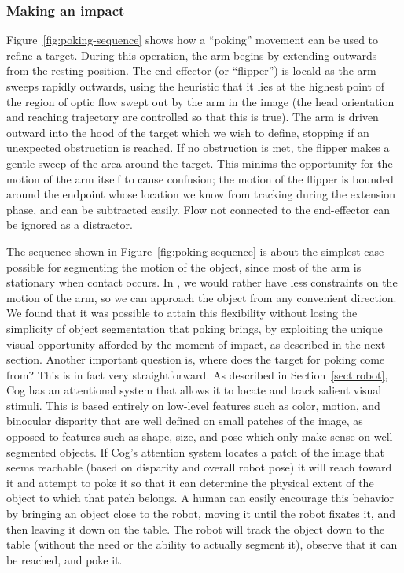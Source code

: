 \subsubsection*{Making an impact}

Figure~\ref{fig:poking-sequence} shows how a ``poking'' movement can
be used to refine a target.  During this operation, the arm begins
by extending outwards from the resting position.  The end-effector (or
``flipper'') is local\ize{}d as the arm sweeps rapidly outwards, using
the heuristic that it lies at the highest point of the region of optic
flow swept out by the arm in the image (the head orientation and
reaching trajectory are controlled so that this is true).  The arm is
driven outward into the \ahhneighbor{}hood of the target which we wish to
define, stopping if an unexpected obstruction is reached.  If no
obstruction is met, the flipper makes a gentle sweep of the area
around the target.  This minim\ize{}s the opportunity for the motion of
the arm itself to cause confusion; the motion of the flipper is
bounded around the endpoint whose location we know from tracking
during the extension phase, and can be subtracted easily.  Flow not
connected to the end-effector can be ignored as a distractor.


The sequence shown in Figure~\ref{fig:poking-sequence} is about the
simplest case possible for segmenting the motion of the object, since most of the arm is stationary
when contact occurs.  
In \ahhpractice{}, we would rather have less
constraints on the motion of the arm, so we can approach the object
from any convenient direction.  We found that it was possible 
to attain this flexibility without losing the simplicity of object
segmentation that poking brings, by exploiting the unique
visual opportunity afforded by the moment of impact,
as described in the next section.
%
\ifrevised
%
Another important question is, where does the target for poking come
from?  This is in fact very straightforward.  As described in
Section~\ref{sect:robot}, Cog has an attentional system that allows it
to locate and track salient visual stimuli.  This is based entirely on
low-level features such as color, motion, and binocular disparity that
are well defined on small patches of the image, as opposed to features
such as shape, size, and pose which only make sense on well-segmented
objects.  If Cog's attention system locates a patch of the image
that seems reachable (based on disparity and overall robot pose)
it will reach toward it and attempt to poke it so that
it can determine the physical extent of the object to which
that patch belongs.  A human can easily encourage this behavior
by bringing an object close to the robot, moving
it until the robot fixates it,
and then leaving it down on the table.  The robot will track the object
down to the table
(without the need or the ability to actually segment it),
 observe that it can be reached, and poke it.
%
\fi
%


